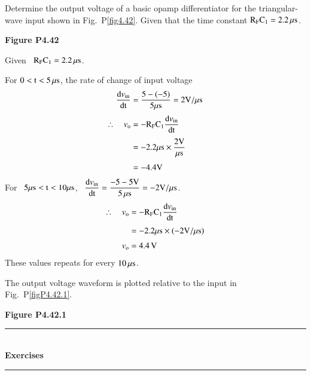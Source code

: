 \begin{problem}\label{prob4.43}
Determine the output voltage of a basic opamp differentiator for the triangular-wave input shown in Fig.~P\ref{fig4.42}. Given that the time constant $\textrm{R}_{\textrm{F}}\textrm{C}_{1}=2.2\,\mu\textrm{s}$.
\begin{center}
{\bf Figure P4.42}
\end{center}
\end{problem}

\begin{solution}
Given \ $\textrm{R}_{\textrm{F}}\textrm{C}_{1}=2.2\,\mu\textrm{s}$.

\medskip
For $0<\textrm{t}<5\,\mu\textrm{s}$, the rate of change of input voltage
\begin{align*}
\dfrac{\textrm{d} v_{\text{in}}}{\operatorname{dt}} &= \frac{5-(-5)}{5\mu\textrm{s}}=2\textrm{V}/\mu\textrm{s}\\[3pt]
\therefore\quad v_{\textrm{o}} &= -\textrm{R}_{\textrm{F}}\textrm{C}_{1}\dfrac{\textrm{d} v_{\text{in}}}{\operatorname{dt}}\\[3pt]
&= -2.2\mu\textrm{s} \times \dfrac{2\textrm{V}}{\mu\textrm{s}}\\[3pt]
&= -4.4\textrm{V}
\end{align*}
For~ $5\mu\textrm{s} <\textrm{t} < 10\mu\textrm{s}$, \ $\dfrac{\textrm{d} v_{\text{in}}}{\operatorname{dt}}=\dfrac{-5-5\textrm{V}}{5\,\mu\textrm{s}}=-2\textrm{V}/\mu\textrm{s}$.
\begin{align*}
\therefore\quad v_{\textrm{o}} &= -\textrm{R}_{\textrm{F}}\textrm{C}_{1}\dfrac{\textrm{d} v_{\text{in}}}{\operatorname{dt}}\\[3pt]
&= -2.2\mu\textrm{s} \times (-2\textrm{V}/\mu\textrm{s})\\[3pt]
v_{\textrm{o}} &= 4.4\,\textrm{V}
\end{align*}
These values repeats for every $10\,\mu\textrm{s}$.

The output voltage waveform is plotted relative to the input in Fig.~P\ref{figP4.42.1}.
\begin{center}
{\bf Figure P4.42.1}
\end{center}
\end{solution}

\begin{center}
\rule{4cm}{1pt}\\
{\bf\Large Exercises}\\[-3pt]
\rule{4cm}{1pt}
\end{center}

